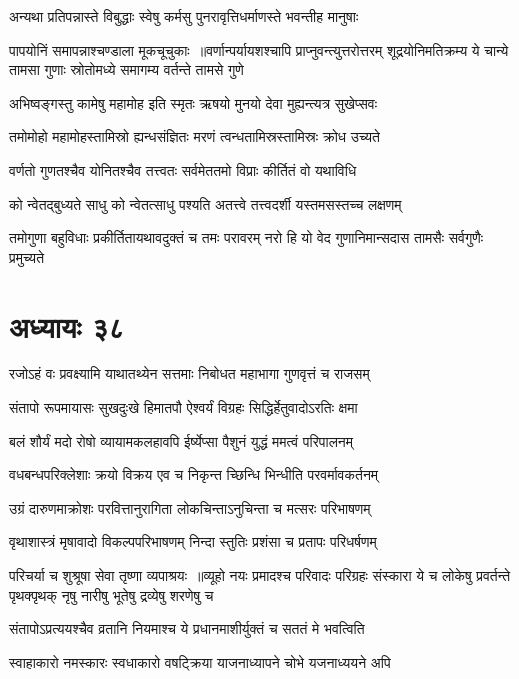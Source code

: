 \twolineshloka
{अन्यथा प्रतिपन्नास्ते विबुद्धाः स्वेषु कर्मसु}
{पुनरावृत्तिधर्माणस्ते भवन्तीह मानुषाः}


पापयोनिं समापन्नाश्चण्डाला मूकचूचुकाः ॥वर्णान्पर्यायशश्चापि प्राप्नुवन्त्युत्तरोत्तरम्
\twolineshloka
{शूद्रयोनिमतिक्रम्य ये चान्ये तामसा गुणाः}
{स्रोतोमध्ये समागम्य वर्तन्ते तामसे गुणे}


\twolineshloka
{अभिष्वङ्गस्तु कामेषु महामोह इति स्मृतः}
{ऋषयो मुनयो देवा मुह्यन्त्यत्र सुखेप्सवः}


\twolineshloka
{तमोमोहो महामोहस्तामिस्रो ह्यन्धसंज्ञितः}
{मरणं त्वन्धतामिस्रस्तामिस्रः क्रोध उच्यते}


\twolineshloka
{वर्णतो गुणतश्चैव योनितश्चैव तत्त्वतः}
{सर्वमेततमो विप्राः कीर्तितं वो यथाविधि}


\twolineshloka
{को न्वेतद्बुध्यते साधु को न्वेतत्साधु पश्यति}
{अतत्त्वे तत्त्वदर्शी यस्तमसस्तच्च लक्षणम्}


\twolineshloka
{तमोगुणा बहुविधाः प्रकीर्तितायथावदुक्तं च तमः परावरम्}
{नरो हि यो वेद गुणानिमान्सदास तामसैः सर्वगुणैः प्रमुच्यते}


\chapter{अध्यायः ३८}
\twolineshloka
{रजोऽहं वः प्रवक्ष्यामि याथातथ्येन सत्तमाः}
{निबोधत महाभागा गुणवृत्तं च राजसम्}


\twolineshloka
{संतापो रूपमायासः सुखदुःखे हिमातपौ}
{ऐश्वर्यं विग्रहः सिद्धिर्हेतुवादोऽरतिः क्षमा}


\twolineshloka
{बलं शौर्यं मदो रोषो व्यायामकलहावपि}
{ईर्ष्येप्सा पैशुनं युद्धं ममत्वं परिपालनम्}


\twolineshloka
{वधबन्धपरिक्लेशाः क्रयो विक्रय एव च}
{निकृन्त च्छिन्धि भिन्धीति परवर्मावकर्तनम्}


\twolineshloka
{उग्रं दारुणमाक्रोशः परवित्तानुरागिता}
{लोकचिन्ताऽनुचिन्ता च मत्सरः परिभाषणम्}


\twolineshloka
{वृथाशास्त्रं मृषावादो विकल्पपरिभाषणम्}
{निन्दा स्तुतिः प्रशंसा च प्रतापः परिधर्षणम्}


परिचर्या च शुश्रूषा सेवा तृष्णा व्यपाश्रयः ॥व्यूहो नयः प्रमादश्च परिवादः परिग्रहः
\twolineshloka
{संस्कारा ये च लोकेषु प्रवर्तन्ते पृथक्पृथक्}
{नृषु नारीषु भूतेषु द्रव्येषु शरणेषु च}


\twolineshloka
{संतापोऽप्रत्ययश्चैव व्रतानि नियमाश्च ये}
{प्रधानमाशीर्युक्तं च सततं मे भवत्विति}


\twolineshloka
{स्वाहाकारो नमस्कारः स्वधाकारो वषट्क्रिया}
{याजनाध्यापने चोभे यजनाध्ययने अपि}



